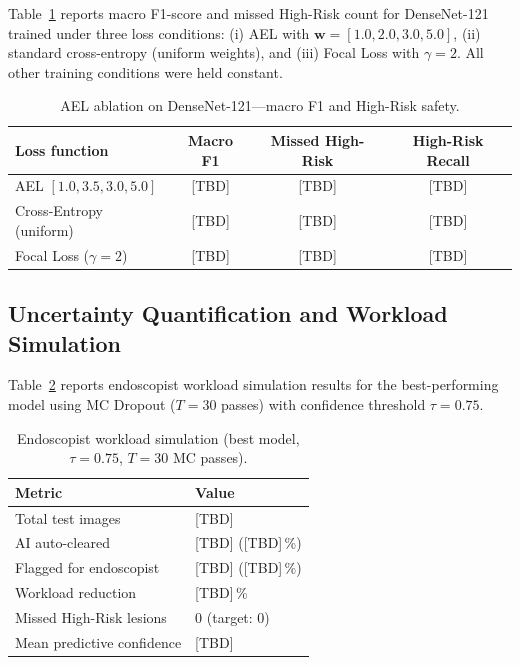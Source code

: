 \documentclass[10pt,a4paper,twocolumn]{article}
\begin{document}
Table~\ref{tab:ablation} reports macro F1-score and missed High-Risk count
for DenseNet-121 trained under three loss conditions: (i) AEL with
$\mathbf{w}=[1.0, 2.0, 3.0, 5.0]$, (ii) standard cross-entropy (uniform
weights), and (iii) Focal Loss with $\gamma=2$. All other training conditions
were held constant.

\begin{table}[htbp]
\centering
\caption{AEL ablation on DenseNet-121---macro F1 and High-Risk safety.}
\label{tab:ablation}
\begin{tabular}{lccc}
\toprule
\textbf{Loss function} & \textbf{Macro F1} &
\textbf{Missed High-Risk} & \textbf{High-Risk Recall}\\
\midrule
AEL $[1.0, 3.5, 3.0, 5.0]$ & [TBD] & [TBD] & [TBD]\\
Cross-Entropy (uniform)      & [TBD] & [TBD] & [TBD]\\
Focal Loss ($\gamma=2$)      & [TBD] & [TBD] & [TBD]\\
\bottomrule
\end{tabular}
\end{table}

\subsection{Uncertainty Quantification and Workload Simulation}

Table~\ref{tab:workload} reports endoscopist workload simulation results for
the best-performing model using MC Dropout ($T=30$ passes) with confidence
threshold $\tau=0.75$.

\begin{table}[htbp]
\centering
\caption{Endoscopist workload simulation (best model, $\tau=0.75$,
  $T=30$ MC passes).}
\label{tab:workload}
\begin{tabular}{ll}
\toprule
\textbf{Metric} & \textbf{Value}\\
\midrule
Total test images          & [TBD]\\
AI auto-cleared            & [TBD] ([TBD]\,\%)\\
Flagged for endoscopist    & [TBD] ([TBD]\,\%)\\
Workload reduction         & [TBD]\,\%\\
Missed High-Risk lesions   & 0 \quad (target: 0)\\
Mean predictive confidence & [TBD]\\
\bottomrule
\end{tabular}
\end{table}
\end{document}
